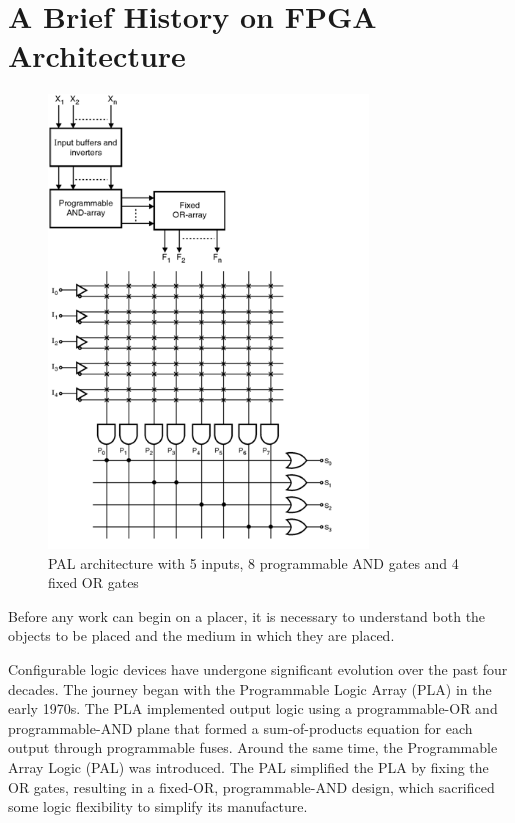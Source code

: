 \documentclass[twocolumn]{article}
\begin{document}
\section{A Brief History on FPGA Architecture}

    \begin{figure}
        \centering
        \includegraphics[width=8.5cm]{figures/pal_2.png}
        \caption{PAL architecture with 5 inputs, 8 programmable AND gates and 4 fixed OR gates}
        \label{fig:pla}
    \end{figure}

    Before any work can begin on a placer, it is necessary to understand both the objects to be placed and the medium in which they are placed.

    Configurable logic devices have undergone significant evolution over the past four decades. 
    The journey began with the Programmable Logic Array (PLA) in the early 1970s. 
    The PLA implemented output logic using a programmable-OR and programmable-AND plane that formed a sum-of-products equation for each output through programmable fuses. 
    Around the same time, the Programmable Array Logic (PAL) was introduced. 
    The PAL simplified the PLA by fixing the OR gates, resulting in a fixed-OR, programmable-AND design, which sacrificed some logic flexibility to simplify its manufacture.
\end{document}
